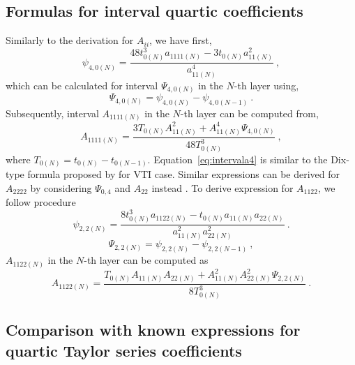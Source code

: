 \subsection{Formulas for interval quartic coefficients}

Similarly to the derivation for $A_{ii}$, we have first, 
\begin{equation}
\psi_{4,0(N)} = \frac{48t^3_{0(N)}a_{1111(N)}-3t_{0(N)}a^2_{11(N)}}{a^4_{11(N)}}~,
\end{equation}
which can be calculated for interval $\Psi_{4,0(N)}$ in the $N$-th layer using,
\begin{equation}
\Psi_{4,0(N)} = \psi_{4,0(N)}- \psi_{4,0(N-1)}~.
\end{equation}
Subsequently, interval $A_{1111(N)}$ in the $N$-th layer can be computed from,
\begin{equation}
\label{eq:intervala4}
A_{1111(N)} = \frac{3T_{0(N)}A^2_{11(N)}+A^4_{11(N)}\Psi_{4,0(N)}}{48T_{0(N)}^3}~,
\end{equation}
where $T_{0(N)}=t_{0(N)}-t_{0(N-1)}$. Equation~\ref{eq:intervala4} is similar to the Dix-type formula proposed by \cite{tsvankinthomsen1994} for  VTI case. Similar expressions can be derived for $A_{2222}$ by considering $\Psi_{0,4}$ and $A_{22}$ instead . To derive  expression for $A_{1122}$, we follow  procedure 
\begin{equation}
\psi_{2,2(N)} = \frac{8t^3_{0(N)}a_{1122(N)}-t_{0(N)}a_{11(N)}a_{22(N)}}{a^2_{11(N)}a^2_{22(N)}}~.
\end{equation}
\begin{equation}
\Psi_{2,2(N)} = \psi_{2,2(N)} - \psi_{2,2(N-1)}~,
\end{equation}
$A_{1122(N)}$ in the $N$-th layer can be computed as
\begin{equation}
A_{1122(N)} = \frac{T_{0(N)}A_{11(N)}A_{22(N)}+A^2_{11(N)}A^2_{22(N)}\Psi_{2,2(N)}}{8T_{0(N)}^3}~.
\end{equation}

\subsection{Comparison with known expressions for quartic Taylor series coefficients}

